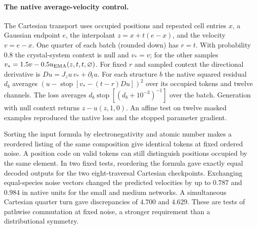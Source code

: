 \paragraph{The native average-velocity control.}
The Cartesian transport uses occupied positions and repeated cell entries \(x\), a Gaussian endpoint \(e\), the interpolant \(z=x+t(e-x)\), and the velocity \(v=e-x\). One quarter of each batch (rounded down) has \(r=t\). With probability \(0.8\) the crystal-system context is null and \(v_*=v\); for the other samples \(v_*=1.5v-0.5u_{\rm EMA}(z,t,t,\varnothing)\). For fixed \(r\) and sampled context the directional derivative is \(D u=J_z u\,v_*+\partial_tu\). For each structure \(b\) the native squared residual \(d_b\) averages \((u-\operatorname{stop}[v_*-(t-r)D u])^2\) over its occupied tokens and twelve channels. The loss averages \(d_b\operatorname{stop}[(d_b+10^{-3})^{-1}]\) over the batch. Generation with null context returns \(z-u(z,1,0)\). An affine test on twelve masked examples reproduced the native loss and the stopped parameter gradient.

Sorting the input formula by electronegativity and atomic number makes a reordered listing of the same composition give identical tokens at fixed ordered noise. A position code on valid tokens can still distinguish positions occupied by the same element. In two fixed tests, reordering the formula gave exactly equal decoded outputs for the two eight-traversal Cartesian checkpoints. Exchanging equal-species noise vectors changed the predicted velocities by up to \(0.787\) and \(0.984\) in native units for the small and medium networks. A simultaneous Cartesian quarter turn gave discrepancies of \(4.700\) and \(4.629\). These are tests of pathwise commutation at fixed noise, a stronger requirement than a distributional symmetry.
